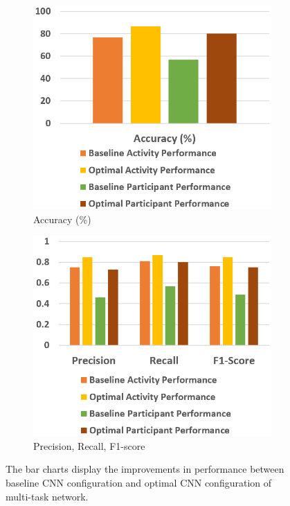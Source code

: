 \documentclass{l4proj}
\begin{document}
\begin{figure}[h]
    \centering
    \begin{subfigure}{0.4\textwidth}
        \includegraphics[width=\textwidth]{images/multitask-configuration-comparison-barchart1.png}
        \caption{Accuracy (\%)}
        \label{fig:multitask-configuration-comparison-barchart1}
    \end{subfigure}
    \qquad
    \begin{subfigure}{0.4\textwidth}
        \includegraphics[width=\textwidth]{images/multitask-configuration-comparison-barchart2.png}
        \caption{Precision, Recall, F1-score}
        \label{fig:multitask-configuration-comparison-barchart2}
    \end{subfigure}
    \caption{The bar charts display the improvements in performance between baseline CNN configuration and optimal CNN configuration of multi-task network.}
    \label{fig:multitask-configuration-comparison}
\end{figure}
\end{document}
